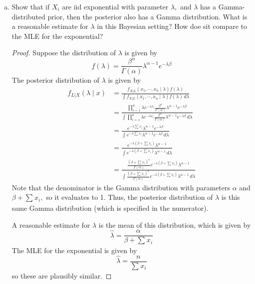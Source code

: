 \documentclass{article}
\begin{document}
\begin{enumerate}
\begin{enumerate}[(a)]
			\item Show that if $X_i$ are iid exponential with parameter $\lambda,$ and $\lambda$ has a Gamma-distributed prior, then the posterior also has a Gamma distribution. What is a reasonable estimate for $\lambda$ in this Bayesian setting? How doe sit compare to the MLE for the exponential?
				\begin{proof}
					Suppose the distribution of $\lambda$ is given by \[f(\lambda)=\frac{\beta^{\alpha}}{\Gamma(\alpha)}\lambda^{\alpha-1} e^{-\lambda\beta}\] The posterior distribution of $\lambda$ is given by
					\begin{align*}
						f_{L|X}(\lambda\mid x) &= \frac{f_{X|L}(x_1, \cdots, x_n\mid \lambda) f(\lambda)}{\int f_{X|L}(x_1, \cdots, x_n\mid\lambda) f(\lambda)\, d\lambda} \\
						&= \frac{\displaystyle \prod_{i=1}^{n} \lambda e^{-\lambda x_i} \frac{\beta^{\alpha}}{\Gamma(\alpha)}\lambda^{\alpha-1}e^{-\lambda\beta}}{\displaystyle\int \prod_{i=1}^{n} \lambda e^{-\lambda x_i} \frac{\beta^{\alpha}}{\Gamma(\alpha)}\lambda^{\alpha-1}e^{-\lambda\beta}\, d\lambda} \\
						&= \frac{e^{-\lambda\sum_{}^{}x_i} \lambda^{\alpha-1} e^{-\lambda\beta}}{\displaystyle \int e^{-\lambda\sum_{}^{}x_i} \lambda^{\alpha-1} e^{-\lambda\beta}\, d\lambda} \\
						&= \frac{e^{-\lambda\left( \beta+\sum_{}^{}x_i \right)}\lambda^{\alpha-1} }{\displaystyle\int e^{-\lambda\left( \beta+\sum_{}^{}x_i \right)}\lambda^{\alpha-1}\, d\lambda} \\
						&= \frac{\frac{\left( \beta+\sum_{}^{}x_i \right)^\alpha}{\Gamma(\alpha)}e^{-\lambda\left( \beta+\sum_{}^{}x_i \right)} \lambda^{\alpha-1}}{\displaystyle\int \frac{\left( \beta+\sum_{}^{}x_i \right)^\alpha}{\Gamma(\alpha)}e^{-\lambda\left( \beta+\sum_{}^{}x_i \right)} \lambda^{\alpha-1}\, d\lambda}
					\end{align*} 
					Note that the denominator is the Gamma distribution with parameters $\alpha$ and $\beta+\sum_{}^{}x_i,$ so it evaluates to 1. Thus, the posterior distribution of $\lambda$ is this same Gamma distribution (which is specified in the numerator). 

					A reasonable estimate for $\lambda$ is the mean of this distribution, which is given by \[\hat{\lambda}=\frac{\alpha}{\beta+\sum_{}^{}x_i}\] The MLE for the exponential is given by \[\hat{\lambda} = \frac{n}{\sum_{}^{}x_i}\] so these are plausibly similar.
					
				\end{proof}
				

\end{enumerate}
\end{enumerate}
\end{document}
